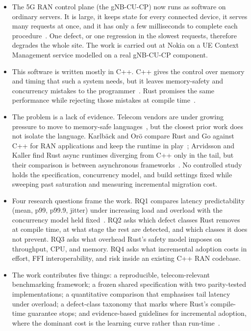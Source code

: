 \documentclass[english,twoside,openright,a4paper,censored,csm,software-track-2020]{HYthesisML}
\begin{document}
\begin{itemize}
  \item The 5G RAN control plane (the gNB-CU-CP) now runs as software on ordinary servers.
        It is large, it keeps state for every connected device, it serves many requests at
        once, and it has only a few milliseconds to complete each procedure~\cite{3gpp22261}.
        One defect, or one regression in the slowest requests, therefore degrades the whole
        site. The work is carried out at Nokia on a UE Context Management service modelled on a
        real gNB-CU-CP component.
  \item This software is written mostly in C++. C++ gives the control over memory and timing
        that such a system needs, but it leaves memory-safety and concurrency mistakes to the
        programmer~\cite{szekeres2013sok}. Rust promises the same performance while rejecting
        those mistakes at compile time~\cite{klabnik2023rust}.
  \item The problem is a lack of evidence. Telecom vendors are under growing pressure to move
        to memory-safe languages~\cite{cisa2023memorysafe}, but the closest prior work does not
        isolate the language. Karlb\"ack and Or\"o compare Rust and Go against C++ for RAN
        applications and keep the runtime in play~\cite{karlback2021ran}; Arvidsson and Kaller
        find Rust async runtimes diverging from C++ only in the tail, but their comparison is
        between asynchronous frameworks~\cite{arvidsson2025async}. No controlled study holds the
        specification, concurrency model, and build settings fixed while sweeping past
        saturation and measuring incremental migration cost.
  \item Four research questions frame the work. RQ1 compares latency predictability (mean,
        p99, p99.9, jitter) under increasing load and overload with the concurrency model held
        fixed~\cite{dean2013tail}. RQ2 asks which defect classes Rust removes at compile time,
        at what stage the rest are detected, and which classes it does not prevent. RQ3 asks what
        overhead Rust's safety model imposes on throughput, CPU, and memory. RQ4 asks what
        incremental adoption costs in effort, FFI interoperability, and risk inside an existing
        C++ RAN codebase.
  \item The work contributes five things: a reproducible, telecom-relevant benchmarking
        framework; a frozen shared specification with two parity-tested implementations; a
        quantitative comparison that emphasises tail latency under overload; a defect-class
        taxonomy that marks where Rust's compile-time guarantee stops; and evidence-based
        guidelines for incremental adoption, where the dominant cost is the learning curve rather
        than run-time~\cite{fulton2021adopting}.
\end{itemize}
\end{document}
